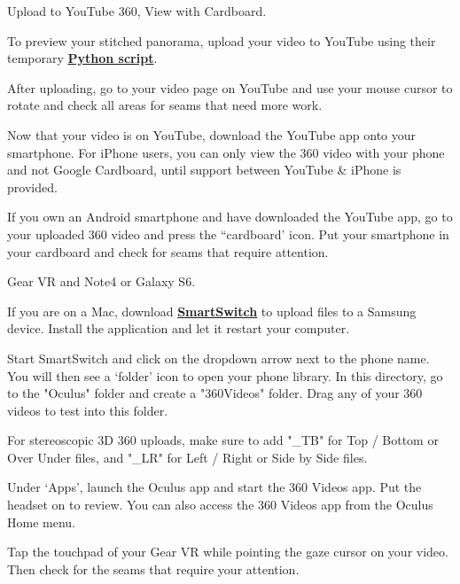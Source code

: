 \begin{fullwidth}
\clearpage
{\large Upload to YouTube 360, View with Cardboard. \par}

To preview your stitched panorama, upload your video to YouTube using their temporary \textbf{\href{https://www.youtube.com/watch?v=Z8VlD2rtACA}{Python script}}.

After uploading, go to your video page on YouTube and use your mouse cursor to rotate and check all areas for seams that need more work.

Now that your video is on YouTube, download the YouTube app onto your smartphone. For iPhone users, you can only view the 360 video with your phone and not Google Cardboard, until support between YouTube & iPhone is provided.

If you own an Android smartphone and have downloaded the YouTube app, go to your uploaded 360 video and press the “cardboard’ icon. Put your smartphone in your cardboard and check for seams that require attention.

{\large Gear VR and Note4 or Galaxy S6. \par}

If you are on a Mac, download \textbf{\href{https://www.dropbox.com/sh/8kqte3wtyt3vltu/AAAjUnNxtXhaxprWF8_q9zbCa?dl=0}{SmartSwitch}} to upload files to a Samsung device. Install the application and let it restart your computer.

Start SmartSwitch and click on the dropdown arrow next to the phone name. You will then see a ‘folder’ icon to open your phone library. In this directory, go to the "Oculus" folder and create a "360Videos" folder. Drag any of your 360 videos to test into this folder.

\tip For stereoscopic 3D 360 uploads, make sure to add "\_TB" for Top / Bottom or Over Under files, and "\_LR" for Left / Right or Side by Side files.


\clearpage

Under ‘Apps’, launch the Oculus app and start the 360 Videos app. Put the headset on to review. You can also access the 360 Videos app from the Oculus Home menu.


Tap the touchpad of your Gear VR while pointing the gaze cursor on your video. Then check for the seams that require your attention.

\clearpage
\end{fullwidth}